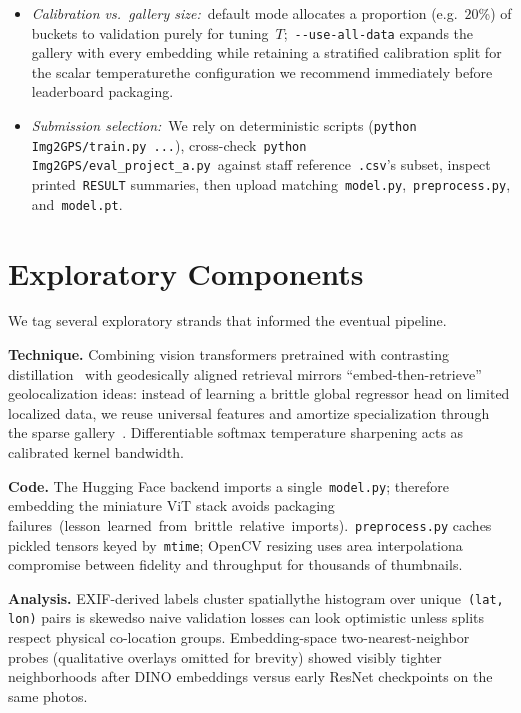 \documentclass[10pt]{article}
\begin{document}
\begin{itemize}
\begin{itemize}[leftmargin=1.25em]
    \item \emph{Calibration vs.\ gallery size:}\ default mode allocates a proportion (e.g.\ $20$\%) of buckets to validation purely for tuning~$T$;~\texttt{-{}-use-all-data} expands the gallery with every embedding while retaining a stratified calibration split for the scalar temperature\textemdash the configuration we recommend immediately before leaderboard packaging.

    \item \emph{Submission selection:}\ We rely on deterministic scripts (\texttt{python Img2GPS/train.py ...}), cross-check~\texttt{python Img2GPS/eval\_project\_a.py}\ against staff reference~\texttt{.csv}'s subset, inspect printed~\texttt{RESULT} summaries, then upload matching~\texttt{model.py},~\texttt{preprocess.py}, and~\texttt{model.pt}.

\end{itemize}


\end{itemize}

\section{Exploratory Components}

We tag several exploratory strands that informed the eventual pipeline.

\textbf{Technique.} Combining vision transformers pretrained with contrasting distillation~\cite{oquab2024dinov2} with geodesically aligned retrieval mirrors ``embed-then-retrieve'' geolocalization ideas: instead of learning a brittle global regressor head on limited localized data, we reuse universal features and amortize specialization through the sparse gallery~\cite{hays2008im2gps}. Differentiable softmax temperature sharpening acts as calibrated kernel bandwidth.

\textbf{Code.} The Hugging Face backend imports a single~\texttt{model.py}; therefore embedding the miniature ViT stack avoids packaging failures~\mbox{(lesson learned from brittle relative imports)}.~\texttt{preprocess.py} caches pickled tensors keyed by~\texttt{mtime}; OpenCV resizing uses area interpolation\textemdash a compromise between fidelity and throughput for thousands of thumbnails.

\textbf{Analysis.} EXIF-derived labels cluster spatially\textemdash the histogram over unique~\texttt{(lat,\,lon)} pairs is skewed\textemdash so naive validation losses can look optimistic unless splits respect physical co-location groups. Embedding-space two-nearest-neighbor probes (qualitative overlays omitted for brevity) showed visibly tighter neighborhoods after DINO embeddings versus early ResNet checkpoints on the same photos.
\end{document}

